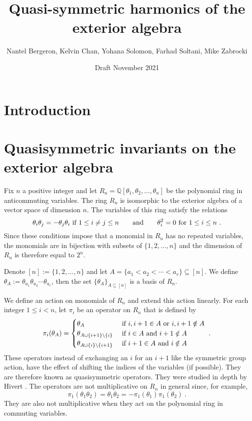 \documentclass[11pt]{amsart}
\title{Quasi-symmetric harmonics of the exterior algebra}
\author{Nantel Bergeron,
Kelvin Chan,
Yohana Solomon,
Farhad Soltani,
Mike Zabrocki}
\date{Draft November 2021}
\theoremstyle{definition}
\numberwithin{equation}{section}
\begin{document}
\maketitle

\section{Introduction}

\section{Quasisymmetric invariants on the exterior algebra}

Fix $n$ a positive integer and
let $R_n = {\mathbb Q}[\theta_1, \theta_2, \ldots, \theta_n]$ be the
polynomial ring in anticommuting variables.
The ring $R_n$ is isomorphic to the exterior algebra of a vector
space of dimension $n$.  The variables of this ring satisfy the relations
\[
\theta_i \theta_j = - \theta_j \theta_i \hbox{ if } 1 \leq i \neq j \leq n
\qquad\hbox{and}\qquad \theta_i^2 = 0 \hbox{ for }1 \leq i \leq n~.
\]
Since these conditions impose that a monomial in $R_n$ has no repeated variables,
the monomials are in bijection with subsets of $\{1,2,\ldots, n\}$
and the dimension of $R_n$ is therefore equal to $2^n$.

Denote $[n] := \{1,2, \ldots,n\}$ and
let $A = \{a_1 < a_2 < \cdots < a_r \} \subseteq [n]$.
We define $\theta_A := \theta_{a_1} \theta_{a_2} \cdots \theta_{a_r}$,
then the set $\{ \theta_A \}_{A \subseteq [n]}$ is a basis of $R_n$.

We define an action on monomials of $R_n$ and extend this action linearly.
For each integer $1 \leq i < n$, let $\pi_i$ be an operator on $R_n$
that is defined by
\[
\pi_i(\theta_A) = \begin{cases}
\theta_{A} & \hbox{ if } i, i+1 \in A\hbox{ or }i, i+1 \notin A\\
\theta_{A \cup \{i+1\} \backslash \{i\}} & \hbox{ if } i\in A\hbox{ and }i+1 \notin A\\
\theta_{A \cup \{i\} \backslash \{i+1\}} & \hbox{ if } i+1\in A\hbox{ and }i \notin A
\end{cases}~.
\]
These operators instead of exchanging an $i$ for an $i+1$ like the symmetric group
action, have the effect of shifting the indices of the variables (if possible).  They
are therefore known as quasisymmetric operators.  They were studied in depth by
Hivert \cite{H}.  The operators are not multiplicative on $R_n$ in general since, for example,
\[
\pi_1( \theta_{1} \theta_{2})
= \theta_1 \theta_2
= - \pi_1( \theta_{1}) \pi_1(\theta_{2})~.
\]
They are also not multiplicative when they act on the polynomial ring
in commuting variables.
\end{document}

